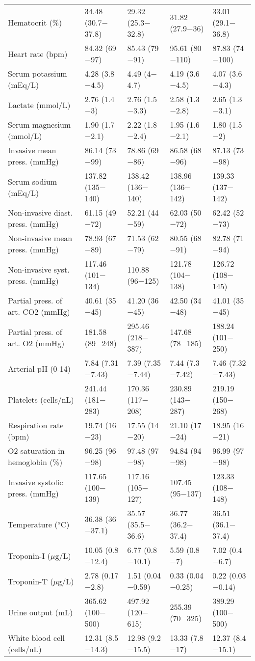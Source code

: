 \begin{table*} [ht!]
\begin{tabular}{lllll}
Hematocrit (\%) & 34.48 (30.7$-$37.8) & 29.32 (25.3$-$32.8) & 31.82 (27.9$-$36) & 33.01 (29.1$-$36.8) \\
Heart rate (bpm) & 84.32 (69$-$97) & 85.43 (79$-$91) & 95.61 (80$-$110) & 87.83 (74$-$100) \\
Serum potassium (mEq/L) & 4.28 (3.8$-$4.5) & 4.49 (4$-$4.7) & 4.19 (3.6$-$4.5) & 4.07 (3.6$-$4.3) \\
Lactate (mmol/L) & 2.76 (1.4$-$3) & 2.76 (1.5$-$3.3) & 2.58 (1.3$-$2.8) & 2.65 (1.3$-$3.1) \\
Serum magnesium (mmol/L) & 1.90 (1.7$-$2.1) & 2.22 (1.8$-$2.4) & 1.95 (1.6$-$2.1) & 1.80 (1.5$-$2) \\
Invasive mean press. (mmHg) & 86.14 (73$-$99) & 78.86 (69$-$86) & 86.58 (68$-$96) & 87.13 (73$-$98) \\
Serum sodium (mEq/L) & 137.82 (135$-$140) & 138.42 (136$-$140) & 138.96 (136$-$142) & 139.33 (137$-$142) \\
Non-invasive diast. press. (mmHg) & 61.15 (49$-$72) & 52.21 (44$-$59) & 62.03 (50$-$72) & 62.42 (52$-$73) \\
Non-invasive mean press. (mmHg) & 78.93 (67$-$89) & 71.53 (62$-$79) & 80.55 (68$-$91) & 82.78 (71$-$94) \\
Non-invasive syst. press. (mmHg) & 117.46 (101$-$134) & 110.88 (96$-$125) & 121.78 (104$-$138) & 126.72 (108$-$145) \\
Partial press. of art. CO2 (mmHg) & 40.61 (35$-$45) & 41.20 (36$-$45) & 42.50 (34$-$48) & 41.01 (35$-$45) \\
Partial press. of art. O2 (mmHg) & 181.58 (89$-$248) & 295.46 (218$-$387) & 147.68 (78$-$185) & 188.24 (101$-$250) \\
Arterial pH (0-14)& 7.84 (7.31$-$7.43) & 7.39 (7.35$-$7.44) & 7.44 (7.3$-$7.42) & 7.46 (7.32$-$7.43) \\
Platelets (cells/nL) & 241.44 (181$-$283) & 170.36 (117$-$208) & 230.89 (143$-$287) & 219.19 (150$-$268) \\
Respiration rate (bpm) & 19.74 (16$-$23) & 17.55 (14$-$20) & 21.10 (17$-$24) & 18.95 (16$-$21) \\
O2 saturation in hemoglobin (\%) & 96.25 (96$-$98) & 97.48 (97$-$98) & 94.84 (94$-$98) & 96.99 (97$-$98) \\
Invasive systolic press. (mmHg) & 117.65 (100$-$139) & 117.16 (105$-$127) & 107.45 (95$-$137) & 123.33 (108$-$148) \\
Temperature ($^o$C) & 36.38 (36$-$37.1) & 35.57 (35.5$-$36.6) & 36.77 (36.2$-$37.4) & 36.51 (36.1$-$37.4) \\
Troponin-I ($\mu$g/L) & 10.05 (0.8$-$12.4) & 6.77 (0.8$-$10.1) & 5.59 (0.8$-$7) & 7.02 (0.4$-$6.7) \\
Troponin-T ($\mu$g/L) & 2.78 (0.17$-$2.8) & 1.51 (0.04$-$0.59) & 0.33 (0.04$-$0.25) & 0.22 (0.03$-$0.14) \\
Urine output (mL) & 365.62 (100$-$500) & 497.92 (120$-$615) & 255.39 (70$-$325) & 389.29 (100$-$500) \\
White blood cell (cells/nL) & 12.31 (8.5$-$14.3) & 12.98 (9.2$-$15.5) & 13.33 (7.8$-$17) & 12.37 (8.4$-$15.1)\\
\hline
\end{tabular}
\label{tab:physionet}
\end{table*}
